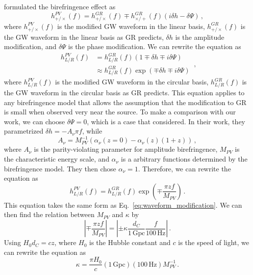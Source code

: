 \documentclass[aps,prd,twocolumn,superscriptaddress,preprintnumbers,floatfix,nofootinbib]{revtex4-2}
\begin{document}
\citet{Wang_2021} formulated the birefringence effect as
\begin{equation}
    h_{+/\times}^{PV}(f) = h_{+/\times}^{GR}(f)\mp h_{\times/+}^{GR}(f)(i\delta h-\delta\Psi)\,,
\end{equation}
where $h_{+/\times}^{PV}(f)$ is the modified \ac{GW} waveform in the linear basis, $h_{+/\times}^{GR}(f)$ is the \ac{GW} waveform in the linear basis as \ac{GR} predicts, $\delta h$ is the amplitude modification, and $\delta\Psi$ is the phase modification.
We can rewrite the equation as
\begin{equation}
\begin{split}
    h_{L/R}^{PV}(f)&=h_{L/R}^{GR}(f)(1\mp\delta h\mp i\delta\Psi)\\
    &\approx h_{L/R}^{GR}(f)\exp\left(\mp\delta h\mp i\delta\Psi\right)
\end{split}
\,,
\end{equation}
where $h_{L/R}^{PV}(f)$ is the modified \ac{GW} waveform in the circular basis, $h_{L/R}^{GR}(f)$ is the \ac{GW} waveform in the circular basis as \ac{GR} predicts.
This equation applies to any birefringence model that allows the assumption that the modification to \ac{GR} is small when observed very near the source.
To make a comparison with our work, we can choose $\delta\Psi=0$, which is a case that \citet{Wang_2021} considered.
In their work, they parametrized $\delta h=-A_\nu\pi f$, while
\begin{equation}
    A_\nu=M_{PV}^{-1}(\alpha_\nu(z=0)-\alpha_\nu(z)(1+z))\,,
\end{equation}
where $A_\nu$ is the parity-violating parameter for amplitude birefringence, $M_{PV}$ is the characteristic energy scale, and $\alpha_\nu$ is a arbitrary functions determined by the birefringence model.
They then chose $\alpha_\nu=1$.
Therefore, we can rewrite the equation as
\begin{equation}
    h_{L/R}^{PV}(f)= h_{L/R}^{GR}(f)\exp\left(\mp\frac{\pi zf}{M_{PV}}\right)\,.
\end{equation}
This equation takes the same form as Eq.~\eqref{eq:waveform_modification}.
We can then find the relation between $M_{PV}$ and $\kappa$ by
\begin{equation}
    \left|\mp\frac{\pi zf}{M_{PV}}\right|=\left|\pm\kappa\frac{d_C}{1\,\mathrm{Gpc}}\frac{f}{100\,\mathrm{Hz}}\right|\,.
\end{equation}
Using $H_0d_C=cz$, where $H_0$ is the Hubble constant and $c$ is the speed of light, we can rewrite the equation as
\begin{equation}
    \kappa=\frac{\pi H_0}{c}\left(1\,\mathrm{Gpc}\right)\left(100\,\mathrm{Hz}\right)M_{PV}^{-1}\,.
\end{equation}


\end{document}
